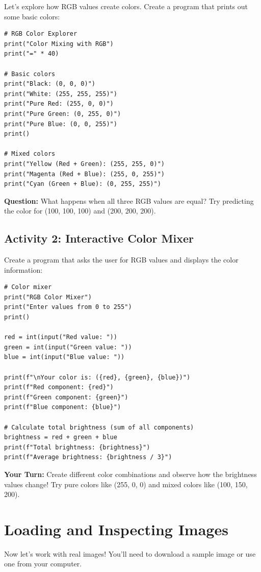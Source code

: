 \documentclass[11pt]{article}
\begin{document}
Let's explore how RGB values create colors. Create a program that prints out some basic colors:

\begin{lstlisting}
# RGB Color Explorer
print("Color Mixing with RGB")
print("=" * 40)

# Basic colors
print("Black: (0, 0, 0)")
print("White: (255, 255, 255)")
print("Pure Red: (255, 0, 0)")
print("Pure Green: (0, 255, 0)")
print("Pure Blue: (0, 0, 255)")
print()

# Mixed colors
print("Yellow (Red + Green): (255, 255, 0)")
print("Magenta (Red + Blue): (255, 0, 255)")
print("Cyan (Green + Blue): (0, 255, 255)")
\end{lstlisting}

\textbf{Question:} What happens when all three RGB values are equal? Try predicting the color for (100, 100, 100) and (200, 200, 200).

\subsection*{Activity 2: Interactive Color Mixer}

Create a program that asks the user for RGB values and displays the color information:

\begin{lstlisting}
# Color mixer
print("RGB Color Mixer")
print("Enter values from 0 to 255")
print()

red = int(input("Red value: "))
green = int(input("Green value: "))
blue = int(input("Blue value: "))

print(f"\nYour color is: ({red}, {green}, {blue})")
print(f"Red component: {red}")
print(f"Green component: {green}")
print(f"Blue component: {blue}")

# Calculate total brightness (sum of all components)
brightness = red + green + blue
print(f"Total brightness: {brightness}")
print(f"Average brightness: {brightness / 3}")
\end{lstlisting}

\textbf{Your Turn:} Create different color combinations and observe how the brightness values change! Try pure colors like (255, 0, 0) and mixed colors like (100, 150, 200).

\section{Loading and Inspecting Images}

Now let's work with real images! You'll need to download a sample image or use one from your computer.
\end{document}
